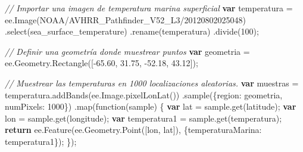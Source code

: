 \documentclass[
  12pt,
  letterpaper,
  twoside]{book}
\newenvironment{Shaded}{\begin{snugshade}}{\end{snugshade}}
\newcommand{\AttributeTok}[1]{\textcolor[rgb]{0.48,0.12,0.64}{#1}}
\newcommand{\CommentTok}[1]{\textcolor[rgb]{0.24,0.58,0.00}{\textit{#1}}}
\newcommand{\ControlFlowTok}[1]{\textcolor[rgb]{0.00,0.00,0.00}{\textbf{#1}}}
\newcommand{\DataTypeTok}[1]{\textcolor[rgb]{0.00,0.00,0.00}{#1}}
\newcommand{\DecValTok}[1]{\textcolor[rgb]{0.28,0.53,0.93}{#1}}
\newcommand{\FloatTok}[1]{\textcolor[rgb]{0.28,0.53,0.93}{#1}}
\newcommand{\FunctionTok}[1]{\textcolor[rgb]{0.48,0.12,0.64}{#1}}
\newcommand{\KeywordTok}[1]{\textcolor[rgb]{0.48,0.12,0.64}{#1}}
\newcommand{\NormalTok}[1]{#1}
\newcommand{\OperatorTok}[1]{\textcolor[rgb]{0.00,0.00,0.00}{#1}}
\newcommand{\StringTok}[1]{\textcolor[rgb]{0.87,0.29,0.22}{#1}}
\begin{document}
\begin{Shaded}
\begin{Highlighting}[]
\CommentTok{// Importar una imagen de temperatura marina superficial}
\ControlFlowTok{var}\NormalTok{ temperatura }\OperatorTok{=} \KeywordTok{ee}\OperatorTok{.}\FunctionTok{Image}\NormalTok{(}\StringTok{\textquotesingle{}NOAA/AVHRR\_Pathfinder\_V52\_L3/20120802025048\textquotesingle{}}\NormalTok{)}
  \OperatorTok{.}\FunctionTok{select}\NormalTok{(}\StringTok{\textquotesingle{}sea\_surface\_temperature\textquotesingle{}}\NormalTok{)}
  \OperatorTok{.}\FunctionTok{rename}\NormalTok{(}\StringTok{\textquotesingle{}temperatura\textquotesingle{}}\NormalTok{)}
  \OperatorTok{.}\FunctionTok{divide}\NormalTok{(}\DecValTok{100}\NormalTok{)}\OperatorTok{;}

\CommentTok{// Definir una geometría donde muestrear puntos}
\ControlFlowTok{var}\NormalTok{ geometria }\OperatorTok{=} \KeywordTok{ee}\OperatorTok{.}\AttributeTok{Geometry}\OperatorTok{.}\FunctionTok{Rectangle}\NormalTok{([}\OperatorTok{{-}}\FloatTok{65.60}\OperatorTok{,} \FloatTok{31.75}\OperatorTok{,} \OperatorTok{{-}}\FloatTok{52.18}\OperatorTok{,} \FloatTok{43.12}\NormalTok{])}\OperatorTok{;}

\CommentTok{// Muestrear las temperaturas en 1000 localizaciones aleatorias.}
\ControlFlowTok{var}\NormalTok{ muestras }\OperatorTok{=}\NormalTok{ temperatura}\OperatorTok{.}\FunctionTok{addBands}\NormalTok{(}\KeywordTok{ee}\OperatorTok{.}\AttributeTok{Image}\OperatorTok{.}\FunctionTok{pixelLonLat}\NormalTok{())}
  \OperatorTok{.}\FunctionTok{sample}\NormalTok{(\{}\DataTypeTok{region}\OperatorTok{:}\NormalTok{ geometria}\OperatorTok{,} \DataTypeTok{numPixels}\OperatorTok{:} \DecValTok{1000}\NormalTok{\})}
  \OperatorTok{.}\FunctionTok{map}\NormalTok{(}\KeywordTok{function}\NormalTok{(sample) \{}
    \ControlFlowTok{var}\NormalTok{ lat }\OperatorTok{=}\NormalTok{ sample}\OperatorTok{.}\FunctionTok{get}\NormalTok{(}\StringTok{\textquotesingle{}latitude\textquotesingle{}}\NormalTok{)}\OperatorTok{;}
    \ControlFlowTok{var}\NormalTok{ lon }\OperatorTok{=}\NormalTok{ sample}\OperatorTok{.}\FunctionTok{get}\NormalTok{(}\StringTok{\textquotesingle{}longitude\textquotesingle{}}\NormalTok{)}\OperatorTok{;}
    \ControlFlowTok{var}\NormalTok{ temperatura1 }\OperatorTok{=}\NormalTok{ sample}\OperatorTok{.}\FunctionTok{get}\NormalTok{(}\StringTok{\textquotesingle{}temperatura\textquotesingle{}}\NormalTok{)}\OperatorTok{;}
    \ControlFlowTok{return} \KeywordTok{ee}\OperatorTok{.}\FunctionTok{Feature}\NormalTok{(}\KeywordTok{ee}\OperatorTok{.}\AttributeTok{Geometry}\OperatorTok{.}\FunctionTok{Point}\NormalTok{([lon}\OperatorTok{,}\NormalTok{ lat])}\OperatorTok{,} 
\NormalTok{    \{}\DataTypeTok{temperaturaMarina}\OperatorTok{:}\NormalTok{ temperatura1\})}\OperatorTok{;}
\NormalTok{  \})}\OperatorTok{;}


\end{Highlighting}
\end{Shaded}
\end{document}
